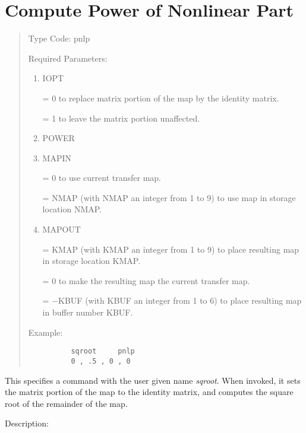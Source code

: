 \newpage
\section{Compute Power of Nonlinear Part}  
\begin{quotation}
\noindent     Type Code:  pnlp
\vspace{5mm}

\noindent Required Parameters:
\begin{enumerate}
       \item  IOPT

              = 0 to replace matrix portion of the map by the identity matrix.

              = 1 to leave the matrix portion unaffected.

       \item  POWER

       \item  MAPIN

              = 0 to use current transfer map.

              = NMAP (with NMAP an integer from 1 to 9) to use map in
                storage location NMAP.

       \item  MAPOUT

              = KMAP (with KMAP an integer from 1 to 9) to place resulting
                map in \hspace*{1em}storage location KMAP.

              = 0 to make the resulting map the current transfer map.

              = $-$KBUF (with KBUF an integer from 1 to 6) to place resulting
                map in buffer number KBUF.
\end{enumerate}

\vspace{5mm}
\noindent     Example:
\begin{verbatim}
          sqroot     pnlp
          0 , .5 , 0 , 0
\end{verbatim}
\end{quotation}
This specifies a command with the user given name {\em sqroot}.  When invoked, it sets the matrix portion of the map to the identity matrix, and computes the square root of the remainder of the map.

\vspace{5mm}
     Description:
\vspace{2mm}

